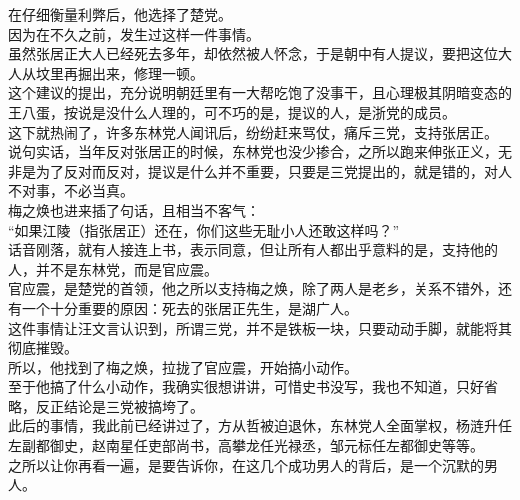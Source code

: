 \begin{multicols}{\theparacolNo}
在仔细衡量利弊后，他选择了楚党。\\

因为在不久之前，发生过这样一件事情。\\

虽然张居正大人已经死去多年，却依然被人怀念，于是朝中有人提议，要把这位大人从坟里再掘出来，修理一顿。\\

这个建议的提出，充分说明朝廷里有一大帮吃饱了没事干，且心理极其阴暗变态的王八蛋，按说是没什么人理的，可不巧的是，提议的人，是浙党的成员。\\

这下就热闹了，许多东林党人闻讯后，纷纷赶来骂仗，痛斥三党，支持张居正。\\

说句实话，当年反对张居正的时候，东林党也没少掺合，之所以跑来伸张正义，无非是为了反对而反对，提议是什么并不重要，只要是三党提出的，就是错的，对人不对事，不必当真。\\

梅之焕也进来插了句话，且相当不客气：\\

“如果江陵（指张居正）还在，你们这些无耻小人还敢这样吗？”\\

话音刚落，就有人接连上书，表示同意，但让所有人都出乎意料的是，支持他的人，并不是东林党，而是官应震。\\

官应震，是楚党的首领，他之所以支持梅之焕，除了两人是老乡，关系不错外，还有一个十分重要的原因：死去的张居正先生，是湖广人。\\

这件事情让汪文言认识到，所谓三党，并不是铁板一块，只要动动手脚，就能将其彻底摧毁。\\

所以，他找到了梅之焕，拉拢了官应震，开始搞小动作。\\

至于他搞了什么小动作，我确实很想讲讲，可惜史书没写，我也不知道，只好省略，反正结论是三党被搞垮了。\\

此后的事情，我此前已经讲过了，方从哲被迫退休，东林党人全面掌权，杨涟升任左副都御史，赵南星任吏部尚书，高攀龙任光禄丞，邹元标任左都御史等等。\\

之所以让你再看一遍，是要告诉你，在这几个成功男人的背后，是一个沉默的男人。\\

\ifnum{}
	\end{multicols}
\fi
\newpage
